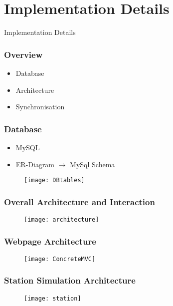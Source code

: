 \section{Implementation Details}
\begin{frame}
	\begin{center}
		\Huge Implementation Details
	\end{center}
\end{frame}
\begin{frame}
\frametitle{Overview}
\begin{itemize}
\item Database
\item Architecture
\item Synchronisation
\end{itemize}
\end{frame}

\begin{frame}
\frametitle{Database}
\begin{itemize}
	\item MySQL
	\item ER-Diagram $\rightarrow$ MySql Schema
\end{itemize}
	\begin{figure}
		\texttt{[image: DBtables]}
	\end{figure}
\end{frame}


\begin{frame}
	\frametitle{Overall Architecture and Interaction}
		\begin{figure}
		\centering
			\texttt{[image: architecture]}
		\end{figure}
\end{frame}

\begin{frame}
	\frametitle{Webpage Architecture}
	\begin{figure}
	\centering
		\texttt{[image: ConcreteMVC]}
	\end{figure}
\end{frame}

\begin{frame}
	\frametitle{Station Simulation Architecture}
		\begin{figure}
		\centering
			\texttt{[image: station]}
		\end{figure}
\end{frame}

